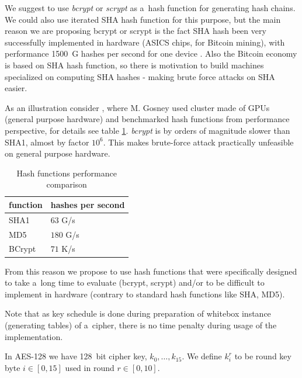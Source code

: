\documentclass[11pt,oneside,final]{fithesis2}
\begin{document}
    We suggest to use \emph{bcrypt} \citep{Provos99afuture-adaptable} or \emph{scrypt} \citep{Percival_strongerkey} as a~hash function for generating hash chains. 
    We could also use iterated SHA hash function for this purpose, but the main reason we are proposing bcrypt or scrypt is the fact SHA hash been
    very successfully implemented in hardware (ASICS chips, for Bitcoin mining), with performance 1500~G hashes per second for one device \cite{shamining_web}.
    Also the Bitcoin economy is based on SHA hash function, so there is motivation to build machines specialized on computing SHA hashes - making
    brute force attacks on SHA easier.

    As an illustration consider \cite{bcrypthash}, where M. Gosney used cluster made of GPUs (general purpose hardware) and benchmarked hash functions from performance perspective, for
    details see table \ref{tbl:hash_performance}. \emph{bcrypt} is by orders of magnitude slower than SHA1, almost by factor $10^6$. This makes brute-force
    attack practically unfeasible on general purpose hardware. 

    \begin{table}
    \begin{center}
    \begin{tabular}{ l | l }
	function & hashes per second \\ \hline
	SHA1     & $63$ G/s \\ \hline
	MD5      & $180$ G/s \\ \hline
	BCrypt   & $71$ K/s \\   \hline
    \end{tabular}
    \caption{Hash functions performance comparison}
    \label{tbl:hash_performance}
    \end{center} 
    \end{table}

    From this reason we propose to use hash functions that were specifically designed to take a~long time to evaluate (bcrypt, scrypt) 
    and/or to be difficult to implement in hardware (contrary to standard hash functions like SHA, MD5).

    Note that as key schedule is done during preparation of whitebox instance (generating tables) of a~cipher, there is no time penalty during 
    usage of the implementation.
        
    In AES-128 we have 128~bit cipher key, $k_0,\dots,k_{15}$. We define $k_i^r$ to be round key byte $i \in [0,15]$ used in round $r \in [0,10]$.
    
\end{document}
